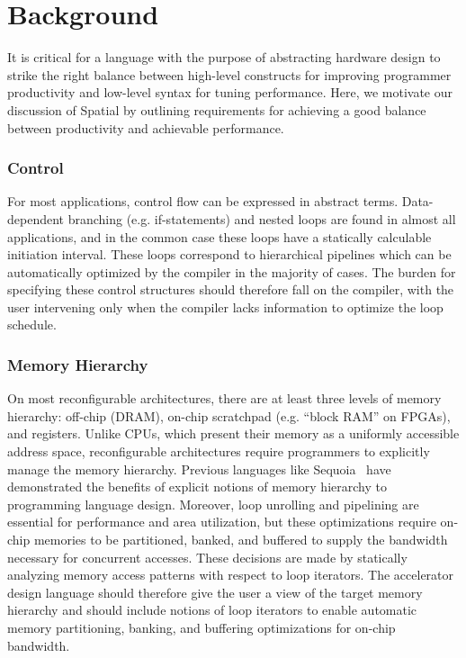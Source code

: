 \chapter{Background}
\label{background}

It is critical for a language with the purpose of abstracting hardware design to strike the right
balance between high-level constructs for improving programmer productivity and low-level syntax for tuning performance. Here, we motivate our discussion of Spatial by outlining requirements for achieving a good balance between productivity and achievable performance.

\subsection{Control}
For most applications, control flow can be expressed in abstract terms. Data-dependent branching (e.g. if-statements) 
and nested loops are found in almost all applications, and in the common case these loops have a statically calculable
initiation interval. These loops correspond to hierarchical pipelines which can be automatically optimized by the 
compiler in the majority of cases. The burden for specifying these control structures should therefore fall on the 
compiler, with the user intervening only when the compiler lacks information to optimize the loop schedule.

\subsection{Memory Hierarchy}
On most reconfigurable architectures, there are at least three levels of memory hierarchy: off-chip (DRAM),
on-chip scratchpad (e.g. ``block RAM'' on FPGAs), and registers. 
Unlike CPUs, which present their memory as a uniformly accessible address space,
reconfigurable architectures require programmers to explicitly manage the memory hierarchy.
Previous languages like Sequoia~\cite{sequoia} have demonstrated the benefits of explicit notions of memory hierarchy
to programming language design. Moreover, loop unrolling and pipelining are essential for performance and area utilization, but these optimizations
require on-chip memories to be partitioned, banked, and buffered to supply the bandwidth necessary for concurrent accesses.
These decisions are made by statically analyzing memory access patterns with respect to loop iterators.
The accelerator design language should therefore give the user a view of the target memory 
hierarchy and should include notions of loop iterators to enable automatic memory partitioning, banking, and buffering optimizations for on-chip bandwidth.

